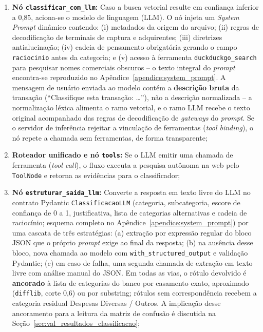 \begin{enumerate}
	\item \textbf{Nó \texttt{classificar\_com\_llm}:} Caso a busca vetorial resulte em confiança inferior a 0,85, aciona-se o modelo de linguagem (LLM). O nó injeta um \textit{System Prompt} dinâmico contendo: (i) metadados da origem do arquivo; (ii) regras de decodificação de terminais de captura e adquirentes; (iii) diretrizes antialucinação; (iv) cadeia de pensamento obrigatória gerando o campo \texttt{raciocinio} antes da categoria; e (v) acesso à ferramenta \texttt{duckduckgo\_search} para pesquisar nomes comerciais obscuros -- o texto integral do \textit{prompt} encontra-se reproduzido no Apêndice~\ref{apendice:system_prompt}. A mensagem de usuário enviada ao modelo contém a \textbf{descrição bruta} da transação (``Classifique esta transação: \ldots''), não a descrição normalizada -- a normalização léxica alimenta o ramo vetorial, e o ramo LLM recebe o texto original acompanhado das regras de decodificação de \textit{gateways} do \textit{prompt}. Se o servidor de inferência rejeitar a vinculação de ferramentas (\textit{tool binding}), o nó repete a chamada sem ferramentas, de forma transparente;
	\item \textbf{Roteador unificado e nó \texttt{tools}:} Se o LLM emitir uma chamada de ferramenta (\textit{tool call}), o fluxo executa a pesquisa autônoma na web pelo \texttt{ToolNode} e retorna as evidências para o classificador;
	\item \textbf{Nó \texttt{estruturar\_saida\_llm}:} Converte a resposta em texto livre do LLM no contrato Pydantic \texttt{ClassificacaoLLM} (categoria, subcategoria, escore de confiança de 0 a 1, justificativa, lista de categorias alternativas e cadeia de raciocínio; esquema completo no Apêndice~\ref{apendice:system_prompt}) por uma cascata de três estratégias: (a) extração por expressão regular do bloco JSON que o próprio \textit{prompt} exige ao final da resposta; (b) na ausência desse bloco, nova chamada ao modelo com \texttt{with\_structured\_output} e validação Pydantic; (c) em caso de falha, uma segunda chamada de extração em texto livre com análise manual do JSON. Em todas as vias, o rótulo devolvido é \textbf{ancorado} à lista de categorias do banco por casamento exato, aproximado (\texttt{difflib}, corte 0,6) ou por substring; rótulos sem correspondência recebem a categoria residual Despesas Diversas / Outros. A implicação desse ancoramento para a leitura da matriz de confusão é discutida na Seção~\ref{sec:val_resultados_classificacao};

\end{enumerate}
